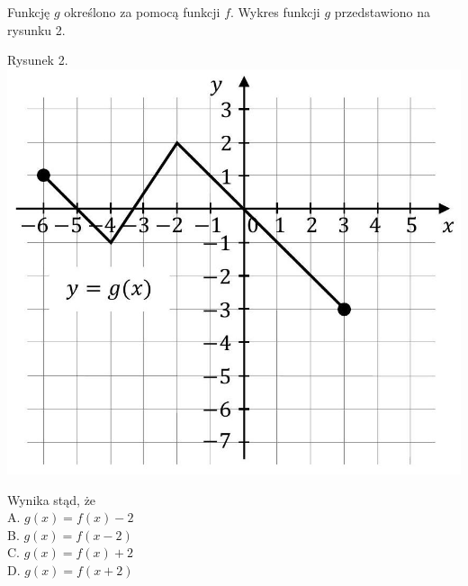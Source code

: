 \documentclass[10pt]{article}
\begin{document}
Funkcję \(g\) określono za pomocą funkcji \(f\). Wykres funkcji \(g\) przedstawiono na rysunku 2.

Rysunek 2.\\
\includegraphics[max width=\textwidth, center]{2024_11_21_465acd0c12fa3e05e8a7g-06(1)}

Wynika stąd, że\\
A. \(g(x)=f(x)-2\)\\
B. \(g(x)=f(x-2)\)\\
C. \(g(x)=f(x)+2\)\\
D. \(g(x)=f(x+2)\)
\end{document}
